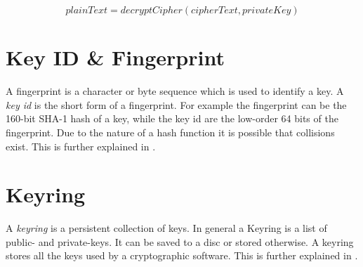 \begin{equation} \label{eq:pkdecrypt}
	plainText = decryptCipher(cipherText, privateKey)
\end{equation}





\section{Key ID \&{} Fingerprint}
\label{section:pre:keyid}

A fingerprint is a character or byte sequence which is used to identify a key.
A \textit{key id} is the short form of a fingerprint.
For example the fingerprint can be the 160-bit SHA-1 hash of a key, while the key id are the low-order 64 bits of the fingerprint. Due to the nature of a hash function it is possible that collisions exist.
This is further explained in \cite[section 12.2]{RFC4880}.


\section{Keyring}
\label{section:pre:keyring}

A \textit{keyring} is a persistent collection of keys. 
In general a Keyring is a list of public- and private-keys. It can be saved to a disc or stored otherwise. 
A keyring stores all the keys used by a cryptographic software.
This is further explained in \cite[section 3.6]{RFC4880}.


